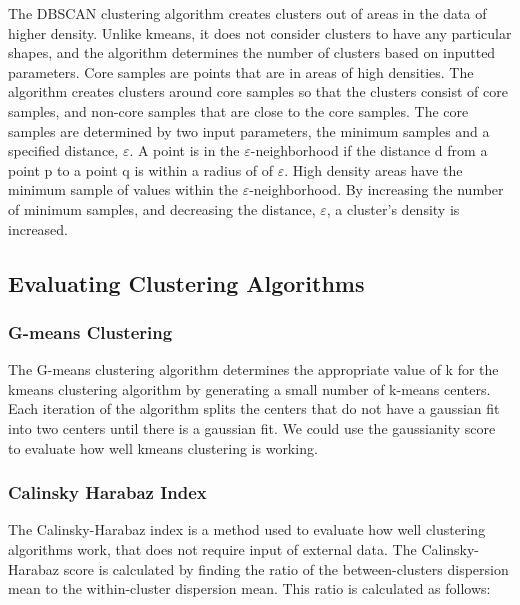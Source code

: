 \documentclass[colorlinks=true,pdfstartview=FitV,linkcolor=blue,
            citecolor=red,urlcolor=magenta]{ligodoc}
\begin{document}
\par The DBSCAN clustering algorithm creates clusters out of areas in the data of higher density. Unlike kmeans, it does not consider clusters to have any particular shapes, and the algorithm determines the number of clusters based on inputted parameters. Core samples are points that are in areas of high densities. The algorithm creates clusters around core samples so that the clusters consist of core samples, and non-core samples that are close to the core samples. The core samples are determined by two input parameters, the minimum samples and a specified distance, $\varepsilon$. A point is in the $\varepsilon$-neighborhood if the distance d from a point p to a point q is within a radius of of $\varepsilon$. High density areas have the minimum sample of values within the $\varepsilon$-neighborhood. By increasing the number of minimum samples, and decreasing the distance, $\varepsilon$, a cluster's density is increased. \cite{Citation2}\cite{Citation4}

\subsection{Evaluating Clustering Algorithms}

\subsubsection{G-means Clustering}

\indent

\par The G-means clustering algorithm determines the appropriate value of k for the kmeans clustering algorithm by generating a small number of k-means centers. Each iteration of the algorithm splits the centers that do not have a gaussian fit into two centers until there is a gaussian fit. We could use the gaussianity score to evaluate how well kmeans clustering is working. \cite{Citation5}  

\subsubsection{Calinsky Harabaz Index}

\indent

\par The Calinsky-Harabaz index is a method used to evaluate how well clustering algorithms work, that does not require input of external data. The Calinsky-Harabaz score is calculated by finding the ratio of the between-clusters dispersion mean to the within-cluster dispersion mean. This ratio is calculated as follows:
\end{document}
